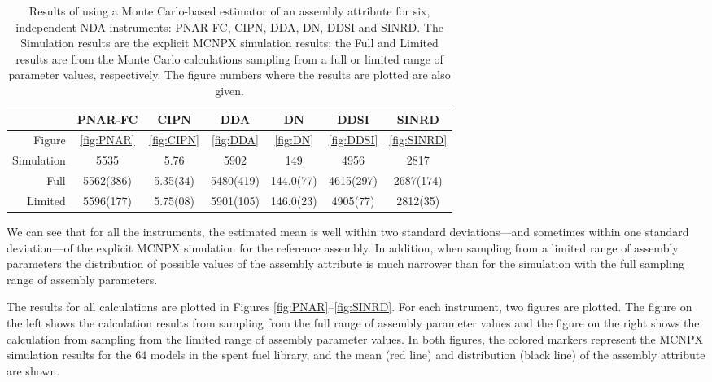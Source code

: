 \documentclass{ansnse}
\begin{document}
\begin{table}[h]\centering
    \begin{tabular}{r@{}S@{}S@{}S@{}S@{}S@{}S}
        \toprule
                     & {PNAR-FC} & {CIPN}   & {DDA}     & {DN}      & {DDSI}    & {SINRD} \\
        \midrule
        Figure       & {\ref{fig:PNAR}} & {\ref{fig:CIPN}} & {\ref{fig:DDA}} & {\ref{fig:DN}} & {\ref{fig:DDSI}} & {\ref{fig:SINRD}} \\
        \midrule
        Simulation   & 5535      & 5.76     & 5902      & 149       & 4956      & 2817 \\
        Full         & 5562(386) & 5.35(34) & 5480(419) & 144.0(77) & 4615(297) & 2687(174) \\
        Limited      & 5596(177) & 5.75(08) & 5901(105) & 146.0(23) & 4905(77)  & 2812(35) \\
        \bottomrule
    \end{tabular}
    \caption{Results of using a Monte Carlo-based estimator of an assembly attribute for six, independent NDA instruments: PNAR-FC, CIPN, DDA, DN, DDSI and SINRD.  The Simulation results are the explicit MCNPX simulation results; the Full and Limited results are from the Monte Carlo calculations sampling from a full or limited range of parameter values, respectively.  The figure numbers where the results are plotted are also given.}
    \label{tab:Results}
\end{table}

We can see that for all the instruments, the estimated mean is well within two standard deviations---and sometimes within one standard deviation---of the explicit MCNPX simulation for the reference assembly.  In addition, when sampling from a limited range of assembly parameters the distribution of possible values of the assembly attribute is much narrower than for the simulation with the full sampling range of assembly parameters.

The results for all calculations are plotted in Figures \ref{fig:PNAR}--\ref{fig:SINRD}.  For each instrument, two figures are plotted.  The figure on the left shows the calculation results from sampling from the full range of assembly parameter values and the figure on the right shows the calculation from sampling from the limited range of assembly parameter values.  In both figures, the colored markers represent the MCNPX simulation results for the 64 models in the spent fuel library, and the mean (red line) and distribution (black line) of the assembly attribute are shown.
\end{document}
